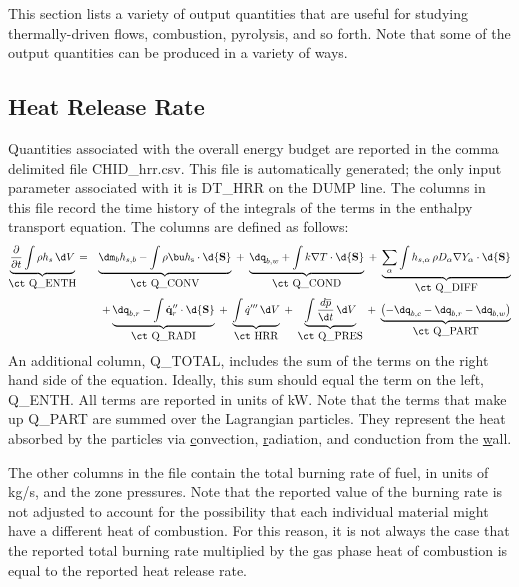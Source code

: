 \documentclass[11pt]{book}
\begin{document}
This section lists a variety of output quantities that are useful for studying thermally-driven flows, combustion, pyrolysis, and so forth. Note that some of the output quantities can be produced in a variety of ways.


\subsection{Heat Release Rate}
\label{info:HRR}

Quantities associated with the overall energy budget are reported in
the comma delimited file {\ct CHID\_hrr.csv}.  This file is
automatically generated; the only input parameter associated with it
is {\ct DT\_HRR} on the {\ct DUMP} line. The columns in this file record the time history of the integrals of the terms in the enthalpy transport equation.
The columns are defined as follows:
\begin{eqnarray}
\label{eqn_enthalpytransport}
\underbrace{\frac{\partial}{\partial t} \int \rho h_s \, \d V }_{\hbox{\ct Q\_ENTH}} &=&
\underbrace{\dm_b h_{s,b} - \int \rho \bu h_{\rm s} \cdot \d {\bf S}}_{\hbox{\ct Q\_CONV}}
\; + \; \underbrace{\dq_{b,w} + \int k \nabla T \cdot \d {\bf S}}_{\hbox{\ct Q\_COND}}
\; + \; \underbrace{\sum_\alpha \int h_{s,\alpha} \, \rho D_\alpha \nabla Y_\alpha \cdot \d {\bf S}}_{\hbox{\ct Q\_DIFF}}  \nonumber \\
&&
+\underbrace{\dq_{b,r} - \int \dot{\mathbf{q}}^{\prime\prime}_{r} \cdot \d {\bf S}}_{\hbox{\ct Q\_RADI}}
\; + \; \underbrace{\int \dot{q}''' \, \d V}_{\hbox{\ct HRR}}
\; + \; \underbrace{\int \frac{d \overline{p} }{\d t} \, \d V}_{\hbox{\ct Q\_PRES}}
\; + \; \underbrace{\left( -\dq_{b,c} - \dq_{b,r} - \dq_{b,w} \right) }_{\hbox{\ct Q\_PART}}
\end{eqnarray}
An additional column, {\ct Q\_TOTAL}, includes the sum of the terms on the right hand side of the equation. Ideally, this sum should equal the term on the left, {\ct Q\_ENTH}. All terms
are reported in units of kW. Note that the terms that make up {\ct Q\_PART} are summed over the Lagrangian particles. They represent the heat absorbed by the particles via \underline{c}onvection, \underline{r}adiation, and conduction from the \underline{w}all.

The other columns in the file contain the total burning rate of
fuel, in units of kg/s, and the zone pressures. Note that the reported value of the burning rate is not adjusted to account for the possibility that each individual
material might have a different heat of combustion. For this reason, it is not always the case that the reported total
burning rate multiplied by the gas phase heat of combustion is equal to the reported heat release rate.
\end{document}

